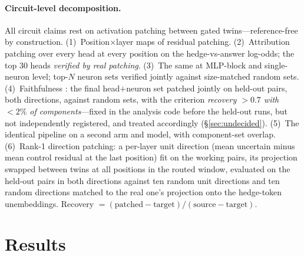 \documentclass{article}
\begin{document}
\paragraph{Circuit-level decomposition.}
All circuit claims rest on activation patching between gated twins---reference-free by construction.
(1)~Position$\times$layer maps of residual patching. (2)~Attribution patching \citep{syed2023attribution}
over every head at every position on the hedge-vs-answer log-odds; the top 30 heads \emph{verified by
real patching}. (3)~The same at MLP-block and single-neuron level; top-$N$ neuron sets verified jointly
against size-matched random sets. (4)~Faithfulness \citep{wang2023ioi}: the final head$+$neuron set
patched jointly on held-out pairs, both directions, against random sets, with the criterion
\emph{recovery $>0.7$ with $<2\%$ of components}---fixed in the analysis code before the held-out runs,
but not independently registered, and treated accordingly (\S\ref{sec:undecided}).
(5)~The identical pipeline on a second arm and model, with component-set overlap. (6)~Rank-1 direction
patching: a per-layer unit direction (mean uncertain minus mean control residual at the last position)
fit on the working pairs, its projection swapped between twins at all positions in the routed window,
evaluated on the held-out pairs in both directions against ten random unit directions and ten random
directions matched to the real one's projection onto the hedge-token unembeddings. Recovery
$=(\text{patched}-\text{target})/(\text{source}-\text{target})$.

\section{Results}
\end{document}
